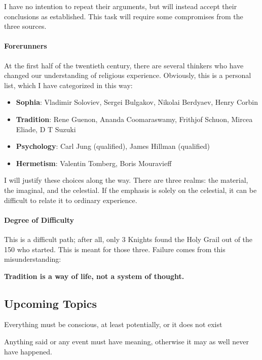 I have no intention to repeat their arguments, but will instead accept their conclusions as established. This task will require some compromises from the three sources.

\paragraph{Forerunners}


At the first half of the twentieth century, there are several thinkers who have changed our understanding of religious experience. Obviously, this is a personal list, which I have categorized in this way:

\begin{itemize}


\item \textbf{Sophia}: Vladimir Soloviev, Sergei Bulgakov, Nikolai Berdyaev, Henry Corbin

\item \textbf{Tradition}: Rene Guenon, Ananda Coomaraswamy, Frithjof Schuon, Mircea Eliade, D T Suzuki

\item \textbf{Psychology}: Carl Jung (qualified), James Hillman (qualified)

\item \textbf{Hermetism}: Valentin Tomberg, Boris Mouravieff

\end{itemize}


I will justify these choices along the way. There are three realms: the material, the imaginal, and the celestial. If the emphasis is solely on the celestial, it can be difficult to relate it to ordinary experience.

\paragraph{Degree of Difficulty}


This is a difficult path; after all, only 3 Knights found the Holy Grail out of the 150 who started. This is meant for those three. Failure comes from this misunderstanding:

\textbf{Tradition is a way of life, not a system of thought.}


\subsection*{Upcoming Topics}


\begin{quotex}
Everything must be conscious, at least potentially, or it does not exist

Anything said or any event must have meaning, otherwise it may as well never have happened.
\end{quotex}


